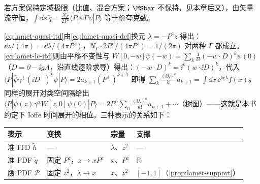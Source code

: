 \begin{definition}
\begin{enumerate}[label=(\roman*),leftmargin=2em,itemsep=1pt,topsep=2pt]
\end{enumerate}
若方案保持定域极限（比值、混合方案；$\MSbar$ 不保持，见本章后文），由矢量流守恒，$\int\dd x\,\tilde q=\frac{N_\Gamma}{2P^z}\langle P|\bar\psi\Gamma\psi|P\rangle$ 等于价夸克数。
\end{definition}

\cref{eq:lamet-quasi-itd}由\cref{eq:lamet-quasi-def}换元 $\lambda=-P^zz$ 得出：$\dd z/(4\pi)=\dd\lambda/(4\pi P^z)$，$N_\Gamma\cdot2P^\Gamma/(4\pi P^z)=1/(2\pi)$ 对两种 $\Gamma$ 都成立。\cref{eq:lamet-lc-itd}则由平移不变性与 $W[0,-w]\psi(-w)=\sum_k\frac1{k!}(-w\cdot D)^k\psi(0)$（$D=\partial-\ii gA$，沿直线逐阶求导）得出：$(-w\cdot D)^k=\ii^k(w\cdot\ii D)^k$，代入 $\langle P|\bar\psi\gamma^+(\ii D^+)^k\psi|P\rangle=2a_{k+1}(P^+)^{k+1}$ 即得 $\sum_k\frac{(\ii\lambda)^k}{k!}a_{k+1}=\int\dd x\,\ee^{\ii x\lambda}f(x)$。同样的展开对类空间隔给出 $\langle P|\bar\psi(z)\gamma^\alpha W[z,0]\psi(0)|P\rangle=2P^\alpha\sum_n\frac{(\ii\lambda)^n}{n!}a_{n+1}+\cdots$（树图）——这就是本书约定下 Ioffe 时间展开的相位。三种表示的关系如下：

\begin{center}
\small
\begin{tabular}{@{}llll@{}}
\toprule
表示 & 变换 & 宗量 & 支撑 \\
\midrule
准 ITD $\tilde h$ & — & $\lambda$、$z^2$ & — \\
准 PDF $\tilde q$ & 固定 $P^z$，$z\to xP^z$ & $x$、$P^z$ & $\mathbb R$ \\
赝 PDF $\mathcal P$ & 固定 $z^2$，$\lambda\to x$ & $x$、$z^2$ & $[-1,1]$（\cref{prop:lamet-support}） \\
\bottomrule
\end{tabular}
\end{center}

